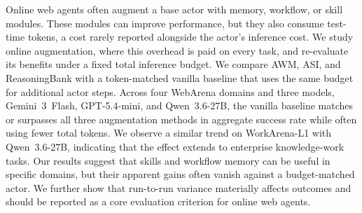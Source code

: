 Online web agents often augment a base actor with memory, workflow, or skill modules.
These modules can improve performance, but they also consume test-time tokens, a cost rarely reported alongside the actor's inference cost.
We study online augmentation, where this overhead is paid on every task, and re-evaluate its benefits under a fixed total inference budget.
We compare AWM, ASI, and ReasoningBank with a token-matched vanilla baseline that uses the same budget for additional actor steps.
Across four WebArena domains and three models, Gemini~3~Flash, GPT-5.4-mini, and Qwen~3.6-27B, the vanilla baseline matches or surpasses all three augmentation methods in aggregate success rate while often using fewer total tokens.
We observe a similar trend on WorkArena-L1 with Qwen~3.6-27B, indicating that the effect extends to enterprise knowledge-work tasks.
Our results suggest that skills and workflow memory can be useful in specific domains, but their apparent gains often vanish against a budget-matched actor.
We further show that run-to-run variance materially affects outcomes and should be reported as a core evaluation criterion for online web agents.